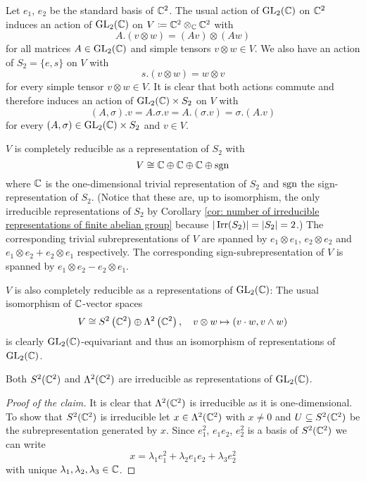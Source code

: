 \begin{expl}
Let $e_1$, $e_2$ be the standard basis of $\mathbb{C}^2$.
The usual action of $\operatorname{GL}_2(\mathbb{C})$ on $\mathbb{C}^2$ induces an action of $\operatorname{GL}_2(\mathbb{C})$ on $V \coloneqq \mathbb{C}^2 \otimes_{\mathbb{C}} \mathbb{C}^2$ with
  \[
      A.(v \otimes w)
    = (Av) \otimes (Aw)
  \]
  for all matrices $A \in \operatorname{GL}_2(\mathbb{C})$ and simple tensors $v \otimes w \in V$.
  We also have an action of $S_2 = \{e, s\}$ on $V$ with
  \[
      s.(v \otimes w)
    = w \otimes v
  \]
  for every simple tensor $v \otimes w \in V$.
  It is clear that both actions commute and therefore induces an action of $\operatorname{GL}_2(\mathbb{C}) \times S_2$ on $V$ with
  \[
      (A,\sigma).v
    = A.\sigma.v
    = A.(\sigma.v)
    = \sigma.(A.v)
  \]
  for every $(A,\sigma) \in \operatorname{GL}_2(\mathbb{C}) \times S_2$ and $v \in V$.
  
  $V$ is completely reducible as a representation of $S_2$ with
  \[
                  V
    \cong         \mathbb{C}
          \oplus  \mathbb{C}
          \oplus  \mathbb{C}
          \oplus  \operatorname{sgn}
  \]
  where $\mathbb{C}$ is the one-dimensional trivial representation of $S_2$ and $\operatorname{sgn}$ the sign-representation of $S_2$.
  (Notice that these are, up to isomorphism, the only irreducible representations of $S_2$ by Corollary \ref{cor: number of irreducible representations of finite abelian group} because $|\operatorname{Irr}(S_2)| = |S_2| = 2$.)
  The corresponding trivial subrepresentations of $V$ are spanned by $e_1 \otimes e_1$, $e_2 \otimes e_2$ and $e_1 \otimes e_2 + e_2 \otimes e_1$ respectively.
  The corresponding sign-subrepresentation of $V$ is spanned by $e_1 \otimes e_2 - e_2 \otimes e_1$.
  
  $V$ is also completely reducible as a representations of $\operatorname{GL}_2(\mathbb{C})$:
  The usual isomorphism of $\mathbb{C}$-vector spaces
  \[
            V
    \cong   S^2\left( \mathbb{C}^2 \right)  \oplus  \Lambda^2\left( \mathbb{C}^2 \right),
    \quad   v \otimes w
    \mapsto (v \cdot w, v \wedge w)
  \]
  is clearly $\operatorname{GL}_2(\mathbb{C})$-equivariant and thus an isomorphism of representations of $\operatorname{GL}_2(\mathbb{C})$.
  
  \begin{claim}
    Both $S^2(\mathbb{C}^2)$ and $\Lambda^2(\mathbb{C}^2)$ are irreducible as representations of $\operatorname{GL}_2(\mathbb{C})$.
  \end{claim}
  \begin{proof}[Proof of the claim]
    It is clear that $\Lambda^2(\mathbb{C}^2)$ is irreducible as it is one-dimensional.
    To show that $S^2(\mathbb{C}^2)$ is irreducible let $x \in \Lambda^2(\mathbb{C}^2)$ with $x \neq 0$ and $U \subseteq S^2(\mathbb{C}^2)$ be the subrepresentation generated by $x$.
    Since $e_1^2$, $e_1 e_2$, $e_2^2$ is a basis of $S^2(\mathbb{C}^2)$ we can write
    \[
        x
      =   \lambda_1 e_1^2
        + \lambda_2 e_1 e_2
        + \lambda_3 e_2^2
    \]
    with unique $\lambda_1, \lambda_2, \lambda_3 \in \mathbb{C}$.
    

\end{proof}
\end{expl}
